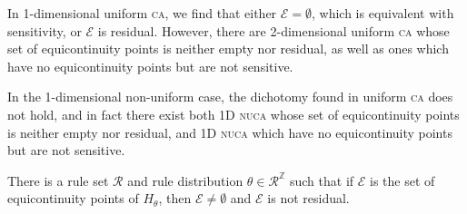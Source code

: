 \documentclass[runningheads]{llncs}
\newcommand{\Z}{\mathbb{Z}}
\newcommand{\R}{\mathcal{R}}
\begin{document}
In 1-dimensional uniform \textsc{ca}, we find that either $\mathcal{E} = \emptyset$, which is equivalent with sensitivity, or $\mathcal{E}$ is residual. 
However, there are 2-dimensional uniform \textsc{ca} whose set of equicontinuity points is neither empty nor residual, as well as ones which have no equicontinuity points but are not sensitive. \cite{equisense}

In the 1-dimensional non-uniform case, the dichotomy found in uniform \textsc{ca} does not hold, and in fact there exist both 1D \textsc{nuca} whose set of equicontinuity points is neither empty nor residual, and 1D \textsc{nuca} which have no equicontinuity points but are not sensitive. 

\begin{theorem} \label{equicounter}
There is a rule set $\R$ and rule distribution $\theta \in \R^\Z$ such that if $\mathcal{E}$ is the set of equicontinuity points of $H_\theta$, then $\mathcal{E} \neq \emptyset$ and $\mathcal{E}$ is not residual.
\end{theorem}
\end{document}
